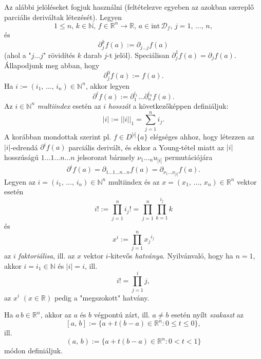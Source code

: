 \documentclass[12pt]{article}
\newcommand{\R}{\mathbb{R}}
\newcommand{\N}{\mathbb{N}}
\newcommand{\D}{\mathcal{D}_f}
\begin{document}
    Az alábbi jelöléseket fogjuk használni (feltételezve egyeben az azokban szereplő parciális deriváltak létezését). Legyen
    \[
        1 \leq n, \, k \in \N, \, f \in \R^n \to \R, \, a \in \text{int} \, \D, \, j = 1, \, \dots, \, n,
    \]
    és
    \[
        \partial_j^kf(a) := \partial_{j \dots j} f(a)
    \]
    (ahol a "$j \dots j$" rövidítés $k$ darab $j$-t jelöl). Speciálisan $\partial_j^1f(a) = \partial_jf(a)$. Állapodjunk meg abban, hogy
    \[
        \partial_j^0f(a) := f(a).
    \]
    Ha $i := (i_1, \, \dots, \, i_n) \in \N^n$, akkor legyen
    \[
        \partial^if(a) := \partial_1^{i_1} \dots \partial_n^{i_n}f(a).
    \]
    Az $i \in \N^n$ \textit{multiindex} esetén az $i$ \textit{hosszát} a következőképpen definiáljuk:
    \[
        |i| := ||i||_1 = \sum_{j=1}^n i_j.
    \]
    A korábban mondottak szerint pl. $f \in D^{|i|} \{a\}$ elégséges ahhoz, hogy létezzen az $|i|$-edrendá $\partial^if(a)$ parciális derivált, és ekkor a Young-tétel miatt az $|i|$ hosszúságú $1 \dots 1 \dots n \dots n$ jelsorozat bármely $\nu_1 \dots _nu_{|i|}$ permutációjára
    \[
        \partial^if(a) = \partial_{1 \dots 1 \dots n \dots n}f(a) = \partial_{\nu_1 \dots \nu_{|i|}}f(a).
    \]
    Legyen az $i = (i_1, \, \dots, \, i_n) \in \N^n$ multiindex és az $x = (x_1, \, \dots, \, x_n) \in \R^n$ vektor esetén
    \[
        i! := \prod_{j=1}^n i_j! = \prod_{j=1}^n \prod_{k=1}^{i_j}k
    \]
    és
    \[
        x^i := \prod_{j=1}^n {x_j}^{i_j}
    \]
    az $i$ \textit{faktoriálisa}, ill. az $x$ vektor $i$-kitevős \textit{hatványa}. Nyilvánvaló, hogy ha $n = 1$, akkor $i = i_1 \in \N$ és $|i| = i$, ill.
    \[
        i! = \prod_{j=1}^i j,
    \]
    az $x^i \, \, (x \in \R)$ pedig a "megszokott" hatvány.\newline

    Ha $a \, b \in \R^n$, akkor az $a$ és $b$ végpontú zárt, ill. $a \neq b$ esetén nyílt \textit{szakaszt} az
    \[
        [a, \, b] := \big\{ a + t(b-a) \in \R^n : 0 \leq t \leq 0 \big\},
    \]
    ill.
    \[
        (a, \, b) := \big\{ a + t(b-a) \in \R^n : 0 < t < 1 \big\}
    \]
    módon definiáljuk.\newline
\end{document}

